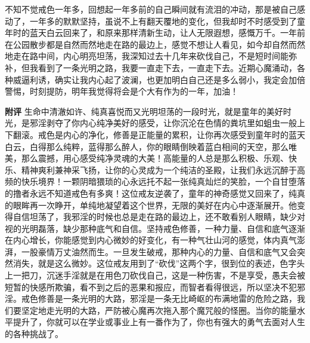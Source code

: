 \begin{case}
    不知不觉戒色一年多，回想起一年多前的自己瞬间就有流泪的冲动，那是被自己感动了，一年多的默默坚持，虽说不上有翻天覆地的变化，但我却时不时感受到了童年时的蓝天白云回来了，和原来那样清新生动，让人无限遐想，感慨万千。一年前在公园散步都是自然而然地走在路的最边上，感觉不想让人看见，如今却自然而然地走在路中间，内心明亮坦荡，我深知过去十几年来砍伐自己，不是短时间能弥补，但我看到了一条光明之路，我要一直走下去，一直走下去。近期心魔涌动，各种威逼利诱，确实让我内心起了波澜，也更加明白自己还是多么弱小，我定会加倍警惕，时刻提防，明年我觉得将会是个大有作为的一年，加油！

    \textbf{附评} 生命中清澈如许、纯真喜悦而又光明坦荡的一段时光，就是童年的美好时光，是邪淫剥夺了你内心纯净美好的感受，让你沉沦在色情的粪坑里如蛆虫一般上下翻滚。戒色是内心的净化，修善是正能量的累积，让你再次感受到童年时的蓝天白云，白得那么纯粹，蓝得那么醉人，你的眼睛倒映着蓝白相间的天空，那么唯美，那么震撼，用心感受纯净灵魂的大美！高能量的人总是那么积极、乐观、快乐、精神爽利兼神采飞扬，让你的心灵成为一个纯洁的圣殿，让我们永远沉醉于高频的快乐境界！一颗阴暗猥琐的心永远托不起一张纯真灿烂的笑脸，一个自甘堕落的撸者永远不知道戒色有多爽！这位戒友逆袭了，童年的神奇感觉又回来了，纯真的眼眸再一次睁开，单纯地凝望着这个世界，无限的美好在内心中逐渐展开。他变得自信坦荡了，我邪淫的时候也总是走在路的最边上，还不敢看别人眼睛，缺少对视的光明磊落，缺少那种底气和自信。坚持戒色修善，一种力量、自信和底气逐渐在内心增长，你能感觉到内心微妙的好变化，有一种气壮山河的感觉，体内真气澎湃，一股豪情万丈油然而生。一旦发生破戒，那种内心的力量、自信和底气又会突然消失，就是这么微妙。这位戒友用到了“砍伐”这两个字，很到位的表述，色字头上一把刀，沉迷手淫就是在用色刀砍伐自己，这是一种伤害，不是享受，愚夫会被短暂的快感所欺骗，看不到之后的恶果和报应，而智者看得很远，所以坚决不犯邪淫。戒色修善是一条光明的大路，邪淫是一条无比崎岖的布满地雷的危险之路，我们要坚定地走光明的大路，严防被心魔再次拖入那个魔咒般的怪圈。当你的能量水平提升了，你就可以在学业或事业上有一番作为了，你也有强大的勇气去面对人生的各种挑战了。
\end{case}


